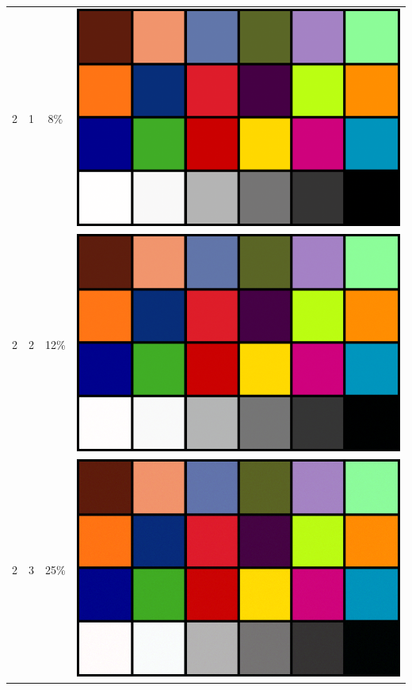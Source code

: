 \documentclass[times, utf8, seminar]{fer}
\begin{document}
\begin{center}
\begin{longtable}{|c|c|c|c|}
2 & 1 &8\% & \includegraphics[scale=0.3]{../benchmark_results/color_chart/2_components-1_bits.png} \\
2 & 2 &12\% & \includegraphics[scale=0.3]{../benchmark_results/color_chart/2_components-2_bits.png} \\
2 & 3 &25\% & \includegraphics[scale=0.3]{../benchmark_results/color_chart/2_components-3_bits.png} \\

\end{longtable}
\end{center}
\end{document}
